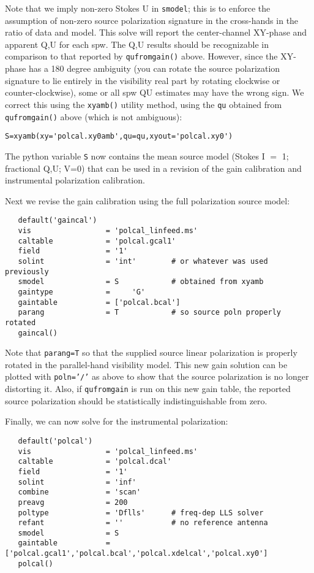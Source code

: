 Note that we imply non-zero Stokes U in {\tt smodel}; this is to
enforce the assumption of non-zero source polarization signature 
in the cross-hands in the ratio of data and model.  This solve
will report the center-channel XY-phase and apparent Q,U for
each spw.  The Q,U results should be recognizable in comparison
to that reported by {\tt qufromgain()} above.  However, since the 
XY-phase has a 180 degree ambiguity (you can rotate the source
polarization signature to lie entirely in the visibility
real part by rotating clockwise or counter-clockwise), some
or all spw QU estimates may have the wrong sign.  We correct
this using the {\tt xyamb()} utility method, using the {\tt qu}
obtained from {\tt qufromgain()} above (which is not
ambiguous):

\small
\begin{verbatim}
S=xyamb(xy='polcal.xy0amb',qu=qu,xyout='polcal.xy0')
\end{verbatim}
\normalsize 

The python variable {\tt S} now contains the mean
source model (Stokes I $=$ 1; fractional Q,U; V=0)
that can be used in a revision of the gain calibration
and instrumental polarization calibration.

Next we revise the gain calibration using the full polarization
source model:

\small
\begin{verbatim}
   default('gaincal')
   vis                 = 'polcal_linfeed.ms'
   caltable            = 'polcal.gcal1'   
   field               = '1'         
   solint              = 'int'        # or whatever was used previously
   smodel              = S            # obtained from xyamb
   gaintype            =     'G'        
   gaintable           = ['polcal.bcal']
   parang              = T            # so source poln properly rotated
   gaincal()
\end{verbatim}
\normalsize 

Note that {\tt parang=T} so that the supplied source linear
polarization is properly rotated in the parallel-hand visibility
model.  This new gain solution can be plotted with {\tt poln='/'} as
above to show that the source polarization is no longer distorting it.
Also, if {\tt qufromgain} is run on this new gain table, the reported
source polarization should be statistically indistinguishable from
zero.

Finally, we can now solve for the instrumental polarization:

\small
\begin{verbatim}
   default('polcal')
   vis                 = 'polcal_linfeed.ms'
   caltable            = 'polcal.dcal'
   field               = '1'
   solint              = 'inf'
   combine             = 'scan'
   preavg              = 200
   poltype             = 'Dflls'      # freq-dep LLS solver
   refant              = ''           # no reference antenna
   smodel              = S
   gaintable           = ['polcal.gcal1','polcal.bcal','polcal.xdelcal','polcal.xy0']
   polcal()
\end{verbatim}
\normalsize


